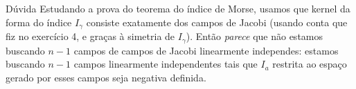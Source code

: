 \begin{thing7}{Dúvida}\leavevmode
Estudando a prova do teorema do índice de Morse, usamos que kernel da forma do índice \(I_\gamma\) consiste exatamente dos campos de Jacobi (usando conta que fiz no exercício 4, e graças à simetria de  \(I_\gamma\)). Então \textit{parece} que não estamos buscando \(n-1\) campos de campos de Jacobi linearmente independes: estamos buscando \(n-1\) campos linearmente independentes tais que \(I_a\) restrita ao espaço gerado por esses campos seja negativa definida.
\end{thing7}





